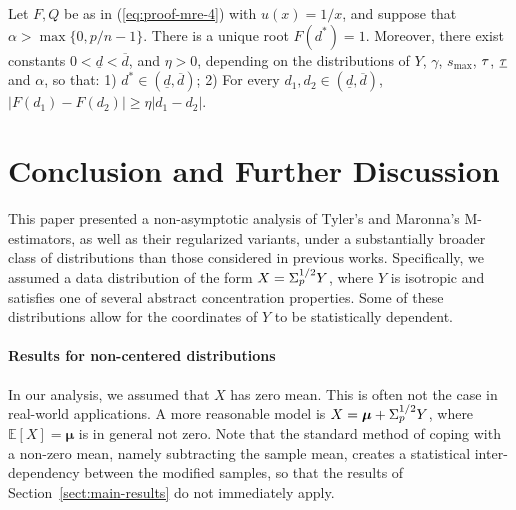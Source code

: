 \documentclass[times,sort&compress,3p]{elsarticle}
\begin{document}
\begin{lemma}
    \label{lem:TRE-1}
    Let $F,Q$ be as in (\ref{eq:proof-mre-4}) with $u(x)=1/x$, and suppose that $\alpha>\max\{0,p/n-1\}$.
    There 
    is a unique root
    $F(d^*)=1$. Moreover, there exist constants $0<\underline{d}<\overline{d}$, and $\eta>0$, depending on the distributions of $Y$, $\gamma$, $s_{\max}$, $\tau$, $\underline{\tau}$ and $\alpha$, so that: 1) $d^*\in (\underline{d},\overline{d})$; 2) For every $d_1,d_2\in (\underline{d},\overline{d})$, $|F(d_1)-F(d_2)|\ge \eta|d_1-d_2|$.
\end{lemma}

\section{Conclusion and Further Discussion}
\label{sec:discussion}

This paper presented a non-asymptotic analysis of Tyler's and Maronna's M-estimators, as well as their regularized variants, under a substantially broader class of distributions than those considered in previous works. Specifically, we assumed a data distribution of the form $X=\Sigma_p^{1/2}Y$, where $Y$ is isotropic and satisfies one of several abstract concentration properties. Some of these distributions allow for  
the coordinates of $Y$ to be statistically dependent. 

\paragraph{Results for non-centered distributions}
In our analysis, we  
assumed that $X$ has zero mean.
This is often not the case in real-world applications. A more reasonable model is $X=\bm{\mu}+\Sigma_p^{1/2}Y$, where  $\mathbb{E}[X]=\bm{\mu}$ is in general not zero. Note that the standard method of coping with a non-zero mean, namely subtracting the sample mean, creates a statistical inter-dependency between the modified samples, so that the results of Section~\ref{sect:main-results} do not immediately apply. 
\end{document}
